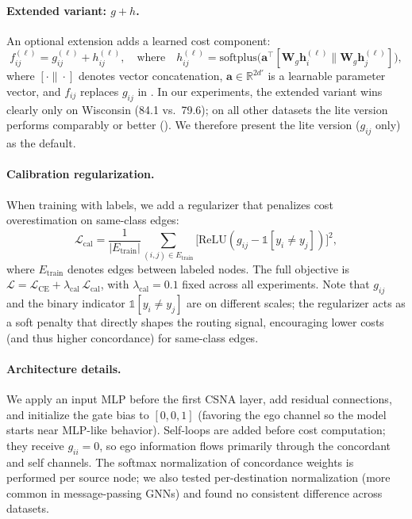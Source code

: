 \documentclass[runningheads]{llncs}
\newcommand{\R}{\mathbb{R}}
\newcommand{\bW}{\mathbf{W}}
\newcommand{\bh}{\mathbf{h}}
\begin{document}
\paragraph{Extended variant: $g + h$.}
An optional extension adds a learned cost component:
\begin{equation}\label{eq:f}
    f_{ij}^{(\ell)} = g_{ij}^{(\ell)} + h_{ij}^{(\ell)}, \quad\text{where}\quad h_{ij}^{(\ell)} = \mathrm{softplus}\bigl(\mathbf{a}^\top [\bW_g \bh_i^{(\ell)} \| \bW_g \bh_j^{(\ell)}]\bigr),
\end{equation}
where $[\cdot \| \cdot]$ denotes vector concatenation, $\mathbf{a} \in \R^{2d'}$ is a learnable parameter vector, and $f_{ij}$ replaces $g_{ij}$ in .
In our experiments, the extended variant wins clearly only on Wisconsin (84.1 vs.\ 79.6); on all other datasets the lite version performs comparably or better ().
We therefore present the lite version ($g_{ij}$ only) as the default.

\paragraph{Calibration regularization.}
When training with labels, we add a regularizer that penalizes cost overestimation on same-class edges:
\begin{equation}\label{eq:cal}
    \mathcal{L}_{\text{cal}} = \frac{1}{|E_{\text{train}}|} \sum_{(i,j) \in E_{\text{train}}} \bigl[\mathrm{ReLU}(g_{ij} - \mathbb{1}[y_i \neq y_j])\bigr]^2,
\end{equation}
where $E_{\text{train}}$ denotes edges between labeled nodes.
The full objective is $\mathcal{L} = \mathcal{L}_{\text{CE}} + \lambda_{\text{cal}}\, \mathcal{L}_{\text{cal}}$, with $\lambda_{\text{cal}} = 0.1$ fixed across all experiments.
Note that $g_{ij}$ and the binary indicator $\mathbb{1}[y_i \neq y_j]$ are on different scales; the regularizer acts as a soft penalty that directly shapes the routing signal, encouraging lower costs (and thus higher concordance) for same-class edges.

\paragraph{Architecture details.}
We apply an input MLP before the first CSNA layer, add residual connections, and initialize the gate bias to $[0, 0, 1]$ (favoring the ego channel so the model starts near MLP-like behavior).
Self-loops are added before cost computation; they receive $g_{ii}=0$, so ego information flows primarily through the concordant and self channels.
The softmax normalization of concordance weights is performed per source node; we also tested per-destination normalization (more common in message-passing GNNs) and found no consistent difference across datasets.
\end{document}

